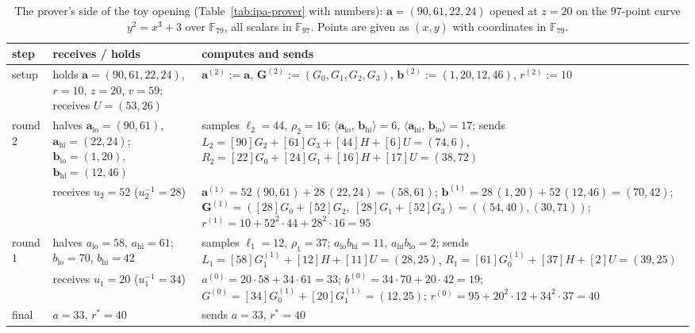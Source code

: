 \documentclass[11pt,a4paper]{article}
\theoremstyle{definition}
\newcommand{\F}{\mathbb{F}}
\newcommand{\ip}[2]{\langle #1,\, #2 \rangle}
\begin{document}
\begin{table}[htbp]
\centering
\footnotesize
\begin{tabular}{l p{4.6cm} p{7.0cm}}
\toprule
step & receives / holds & computes and sends \\
\midrule
setup
 & holds $\mathbf a = (90, 61, 22, 24)$, $r = 10$, $z = 20$, $v = 59$;
   receives $U = (53, 26)$
 & $\mathbf a^{(2)} := \mathbf a$, $\mathbf G^{(2)} := (G_0, G_1, G_2,
   G_3)$, $\mathbf b^{(2)} := (1, 20, 12, 46)$, $r^{(2)} := 10$ \\
\addlinespace
round $2$
 & halves $\mathbf a_{\mathrm{lo}} = (90, 61)$,
   $\mathbf a_{\mathrm{hi}} = (22, 24)$;
   $\mathbf b_{\mathrm{lo}} = (1, 20)$, $\mathbf b_{\mathrm{hi}} = (12, 46)$
 & samples $\ell_2 = 44$, $\rho_2 = 16$;
   $\ip{\mathbf a_{\mathrm{lo}}}{\mathbf b_{\mathrm{hi}}} = 6$,
   $\ip{\mathbf a_{\mathrm{hi}}}{\mathbf b_{\mathrm{lo}}} = 17$;
   sends $L_2 = [90]G_2 + [61]G_3 + [44]H + [6]U = (74, 6)$,
   $R_2 = [22]G_0 + [24]G_1 + [16]H + [17]U = (38, 72)$ \\
 & receives $u_2 = 52$ ($u_2^{-1} = 28$)
 & $\mathbf a^{(1)} = 52\,(90, 61) + 28\,(22, 24) = (58, 61)$;
   $\mathbf b^{(1)} = 28\,(1, 20) + 52\,(12, 46) = (70, 42)$;
   $\mathbf G^{(1)} = ([28]G_0 + [52]G_2,\ [28]G_1 + [52]G_3)
   = ((54, 40), (30, 71))$;
   $r^{(1)} = 10 + 52^{2}\cdot 44 + 28^{2}\cdot 16 = 95$ \\
\addlinespace
round $1$
 & halves $a_{\mathrm{lo}} = 58$, $a_{\mathrm{hi}} = 61$;
   $b_{\mathrm{lo}} = 70$, $b_{\mathrm{hi}} = 42$
 & samples $\ell_1 = 12$, $\rho_1 = 37$;
   $a_{\mathrm{lo}} b_{\mathrm{hi}} = 11$,
   $a_{\mathrm{hi}} b_{\mathrm{lo}} = 2$;
   sends $L_1 = [58]G^{(1)}_1 + [12]H + [11]U = (28, 25)$,
   $R_1 = [61]G^{(1)}_0 + [37]H + [2]U = (39, 25)$ \\
 & receives $u_1 = 20$ ($u_1^{-1} = 34$)
 & $a^{(0)} = 20\cdot 58 + 34\cdot 61 = 33$;
   $b^{(0)} = 34\cdot 70 + 20\cdot 42 = 19$;
   $G^{(0)} = [34]G^{(1)}_0 + [20]G^{(1)}_1 = (12, 25)$;
   $r^{(0)} = 95 + 20^{2}\cdot 12 + 34^{2}\cdot 37 = 40$ \\
\addlinespace
final
 & $a = 33$, $r^{*} = 40$
 & sends $a = 33$, $r^{*} = 40$ \\
\bottomrule
\end{tabular}
\caption{The prover's side of the toy opening (Table~\ref{tab:ipa-prover}
with numbers): $\mathbf a = (90, 61, 22, 24)$ opened at $z = 20$ on the
$97$-point curve $y^2 = x^3 + 3$ over $\F_{79}$, all scalars in
$\F_{97}$. Points are given as $(x, y)$ with coordinates in $\F_{79}$.}
\label{tab:ipa-toy-prover}
\end{table}
\end{document}
